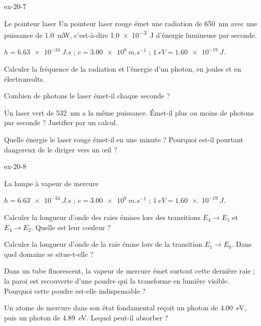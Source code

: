 \begin{blocLivre}{ex-20-7}
\begin{exercice}[2]{Le pointeur laser}
Un pointeur laser rouge émet une radiation de \qty{650}{nm} avec une puissance de \qty{1,0}{mW}, c'est-à-dire \qty{1,0e-3}{J} d'énergie lumineuse par seconde.
\begin{donnees}
$h=\qty{6,63e-34}{J.s}$ ; $c=\qty{3,00e8}{m.s^{-1}}$ ; $\qty{1}{eV}=\qty{1,60e-19}{J}$.
\end{donnees}
\begin{questions}
\item Calculer la fréquence de la radiation et l'énergie d'un photon, en joules et en électronvolts.
\item Combien de photons le laser émet-il chaque seconde ?
\item Un laser vert de \qty{532}{nm} a la même puissance. Émet-il plus ou moins de photons par seconde ? Justifier par un calcul.
\item Quelle énergie le laser rouge émet-il en une minute ? Pourquoi est-il pourtant dangereux de le diriger vers un œil ?
\end{questions}
\end{exercice}
\end{blocLivre}
\begin{blocLivre}{ex-20-8}
\begin{exercice}[2]{La lampe à vapeur de mercure}
\begin{donnees}
$h=\qty{6,63e-34}{J.s}$ ; $c=\qty{3,00e8}{m.s^{-1}}$ ; $\qty{1}{eV}=\qty{1,60e-19}{J}$.
\end{donnees}
\begin{questions}
\item Calculer la longueur d'onde des raies émises lors des transitions $E_4\to E_1$ et $E_4\to E_2$. Quelle est leur couleur ?
\item Calculer la longueur d'onde de la raie émise lors de la transition $E_1\to E_0$. Dans quel domaine se situe-t-elle ?
\item Dans un tube fluorescent, la vapeur de mercure émet surtout cette dernière raie ; la paroi est recouverte d'une poudre qui la
transforme en lumière visible. Pourquoi cette poudre est-elle indispensable ?
\item Un atome de mercure dans son état fondamental reçoit un photon de \qty{4,00}{eV}, puis un photon de \qty{4,89}{eV}. Lequel peut-il absorber ?
\end{questions}
\end{exercice}
\end{blocLivre}
